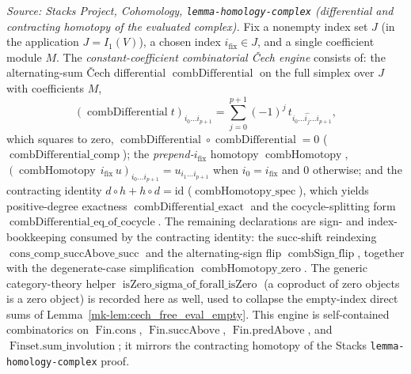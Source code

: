 \begin{lemma}
  \label{mk-lem:free_cech_engine}

  \textit{Source: Stacks Project, Cohomology, \texttt{lemma-homology-complex}
  (differential and contracting homotopy of the evaluated complex).}
  Fix a nonempty index set \(J\) (in the application \(J = I_1(V)\)), a chosen index
  \(i_{\mathrm{fix}} \in J\), and a single coefficient module \(M\). The
  \emph{constant-coefficient combinatorial {\v C}ech engine} consists of: the
  alternating-sum {\v C}ech differential \(\operatorname{combDifferential}\) on the
  full simplex over \(J\) with coefficients \(M\),
  \[
    (\operatorname{combDifferential} t)_{i_0 \ldots i_{p+1}}
      = \sum_{j=0}^{p+1} (-1)^j\, t_{i_0 \ldots \widehat{i_j} \ldots i_{p+1}},
  \]
  which squares to zero, \(\operatorname{combDifferential} \circ
  \operatorname{combDifferential} = 0\) (\(\operatorname{combDifferential\_comp}\)); the
  \emph{prepend-\(i_{\mathrm{fix}}\)} homotopy \(\operatorname{combHomotopy}\),
  \((\operatorname{combHomotopy}\, i_{\mathrm{fix}}\, u)_{i_0 \ldots i_{p+1}}
  = u_{i_1 \ldots i_{p+1}}\) when \(i_0 = i_{\mathrm{fix}}\) and \(0\) otherwise; and
  the contracting identity \(d \circ h + h \circ d = \mathrm{id}\)
  (\(\operatorname{combHomotopy\_spec}\)), which yields positive-degree exactness
  \(\operatorname{combDifferential\_exact}\) and the cocycle-splitting form
  \(\operatorname{combDifferential\_eq\_of\_cocycle}\). The remaining declarations are
  sign- and index-bookkeeping consumed by the contracting identity: the
  succ-shift reindexing \(\operatorname{cons\_comp\_succAbove\_succ}\) and the
  alternating-sign flip \(\operatorname{combSign\_flip}\), together with the
  degenerate-case simplification \(\operatorname{combHomotopy\_zero}\). The generic
  category-theory helper \(\operatorname{isZero\_sigma\_of\_forall\_isZero}\) (a
  coproduct of zero objects is a zero object) is recorded here as well, used to collapse
  the empty-index direct sums of Lemma~\ref{mk-lem:cech_free_eval_empty}. This engine is
  self-contained combinatorics on \(\operatorname{Fin.cons}\),
  \(\operatorname{Fin.succAbove}\), \(\operatorname{Fin.predAbove}\), and
  \(\operatorname{Finset.sum\_involution}\); it mirrors the contracting homotopy of the
  Stacks \texttt{lemma-homology-complex} proof.
\end{lemma}

